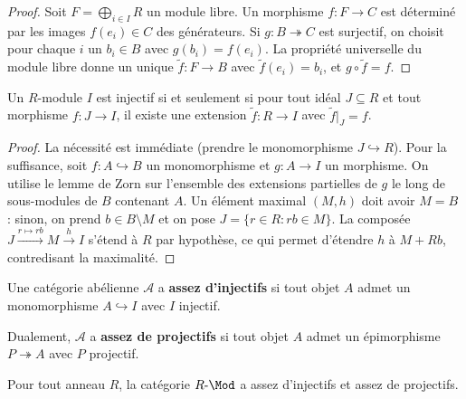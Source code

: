 \begin{proof}
Soit $F = \bigoplus_{i \in I} R$ un module libre. Un morphisme
$f \colon F \to C$ est déterminé par les images $f(e_i) \in C$ des
générateurs. Si $g \colon B \twoheadrightarrow C$ est surjectif, on
choisit pour chaque $i$ un $b_i \in B$ avec $g(b_i) = f(e_i)$.
La propriété universelle du module libre donne un unique
$\tilde{f} \colon F \to B$ avec $\tilde{f}(e_i) = b_i$, et
$g \circ \tilde{f} = f$.
\end{proof}

\begin{theoreme}\label{thm:baer-criterion}
Un $R$-module $I$ est injectif si et seulement si pour tout
idéal $J \subseteq R$ et tout morphisme $f \colon J \to I$,
il existe une extension $\tilde{f} \colon R \to I$ avec
$\tilde{f}|_J = f$.
\end{theoreme}

\begin{proof}
La nécessité est immédiate (prendre le monomorphisme $J \hookrightarrow R$).
Pour la suffisance, soit $f \colon A \hookrightarrow B$ un monomorphisme
et $g \colon A \to I$ un morphisme. On utilise le lemme de Zorn sur
l'ensemble des extensions partielles de $g$ le long de sous-modules
de $B$ contenant $A$. Un élément maximal $(M, h)$ doit avoir $M = B$ :
sinon, on prend $b \in B \setminus M$ et on pose
$J = \{r \in R : rb \in M\}$. La composée
$J \xrightarrow{r \mapsto rb} M \xrightarrow{h} I$
s'étend à $R$ par hypothèse, ce qui permet d'étendre $h$ à $M + Rb$,
contredisant la maximalité.
\end{proof}

\begin{definition}\label{def:enough-injectives}
Une catégorie abélienne $\mathcal{A}$ a \textbf{assez d'injectifs}
si tout objet $A$ admet un monomorphisme $A \hookrightarrow I$ avec
$I$ injectif.

Dualement, $\mathcal{A}$ a \textbf{assez de projectifs} si tout
objet $A$ admet un épimorphisme $P \twoheadrightarrow A$ avec $P$
projectif.
\end{definition}

\begin{theoreme}\label{thm:R-mod-enough}
Pour tout anneau $R$, la catégorie $R\text{-}\Mod$ a assez d'injectifs
et assez de projectifs.
\end{theoreme}

